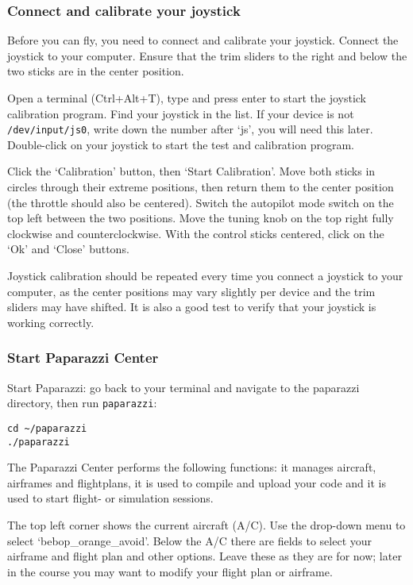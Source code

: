 \documentclass{article}
\begin{document}
\subsubsection*{Connect and calibrate your joystick}
Before you can fly, you need to connect and calibrate your joystick.
Connect the joystick to your computer. Ensure that the trim sliders to the right and below the two sticks are in the center position.

Open a terminal (Ctrl+Alt+T), type  and press enter to start the joystick calibration program. Find your joystick in the list. If your device is not \verb"/dev/input/js0", write down the number after `js', you will need this later. Double-click on your joystick to start the test and calibration program.

Click the `Calibration' button, then `Start Calibration'. Move both sticks in circles through their extreme positions, then return them to the center position (the throttle should also be centered). Switch the autopilot mode switch on the top left between the two positions. Move the tuning knob on the top right fully clockwise and counterclockwise. With the control sticks centered, click on the `Ok' and `Close' buttons.

Joystick calibration should be repeated every time you connect a joystick to your computer, as the center positions may vary slightly per device and the trim sliders may have shifted. It is also a good test to verify that your joystick is working correctly.

\subsubsection*{Start Paparazzi Center}
Start Paparazzi: go back to your terminal and navigate to the paparazzi directory, then run \texttt{paparazzi}:
\begin{lstlisting}[style=Bash]
cd ~/paparazzi
./paparazzi
\end{lstlisting}

\medskip
The Paparazzi Center performs the following functions: it manages aircraft, airframes and flightplans, it is used to compile and upload your code and it is used to start flight- or simulation sessions.

The top left corner shows the current aircraft (A/C). Use the drop-down menu to select `bebop\_orange\_avoid'.
Below the A/C there are fields to select your airframe and flight plan and other options. Leave these as they are for now; later in the course you may want to modify your flight plan or airframe.
\end{document}
